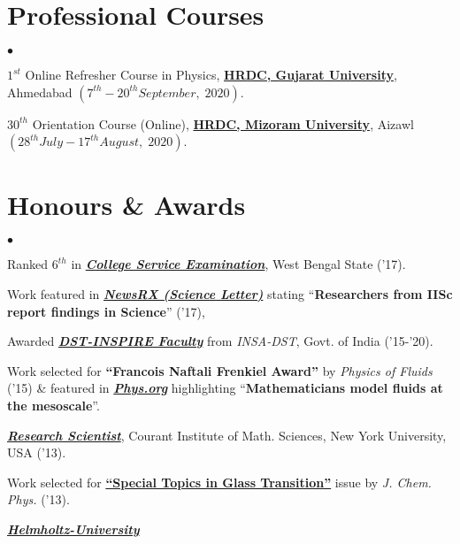 \documentclass[margin,line]{res}
\newenvironment{list2}{
  \begin{list}{$\bullet$}{%
      \setlength{\itemsep}{0in}
      \setlength{\parsep}{0in} \setlength{\parskip}{0in}
      \setlength{\topsep}{0in} \setlength{\partopsep}{0in} 
      \setlength{\leftmargin}{0.2in}}}{\end{list}}
\begin{document}
\begin{resume}
\section{\sc Professional Courses}
\begin{list2}
\item $1^{st}$ Online Refresher Course in Physics, {\bf \href{https://hrdc.gujaratuniversity.ac.in/}{HRDC, Gujarat University}}, 
Ahmedabad $(7^{th}-20^{th} September,\; 2020)$.
\item $30^{th}$ Orientation Course (Online), {\bf \href{https://hrdcmzu.in/}{HRDC, Mizoram University}}, Aizawl $(28^{th} July - 17^{th} August,\; 2020)$.
\end{list2}
\vspace{1mm}

\section{\sc Honours \& Awards}
\begin{list2}
\item Ranked {$6^{th}$} in \href{http://www.wbcsc.ac.in}{\textit{\textbf{College Service Examination}}}, West Bengal State ('17).
\item Work featured in \href{http://info.newsrx.com/hubfs/Corresponding\ Author\ Email\ Campaigns/Science\ Letter\ 02.03.17.pdf}
{\textit{\textbf{NewsRX (Science Letter)}}} stating ``{\bf Researchers from IISc report findings in Science}'' ('17),
\item Awarded \href{http://www.inspire-dst.gov.in/faculty_scheme.html}{\textit{\textbf{DST-INSPIRE Faculty}}} from {\it INSA-DST}, Govt. of India ('15-'20).
\item Work selected for {\bf ``Francois Naftali Frenkiel Award''} by {\it Physics of Fluids} ('15) \& 
      featured in \href{http://phys.org/news/2015-03-mathematicians-fluids-mesoscale.html}{\textit{\textbf{Phys.org}}} highlighting 
      ``{\bf Mathematicians model fluids at the mesoscale}''. 
\item \href{https://cims.nyu.edu/~donev/Group.html}{\textit{\textbf{Research Scientist}}}, Courant Institute of Math. Sciences, New York University, USA ('13).
\item Work selected for \href{http://scitation.aip.org/upload/AIP/JCP/special_topics/Special_Topic_Glass_Transition.pdf}{\textbf{``Special Topics 
      in Glass Transition''}} issue by {\it J. Chem. Phys.} ('13). 
\item \href{https://www.helmholtz.de/en/jobs_talent/funding_programs/helmholtz_young_investigators_groups/}{\textit{\textbf{Helmholtz-University 
}}}
\end{list2}
\end{resume}
\end{document}
